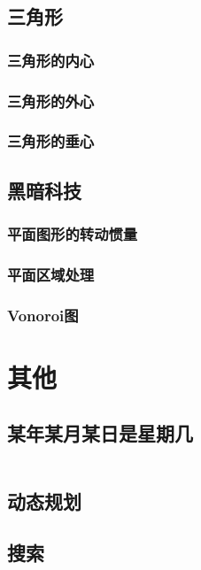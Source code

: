 \documentclass[a4paper]{article}
\newcommand{\cppcode}[1]{
    \inputminted[mathescape]{cpp}{source/#1}
}
\begin{document}
\subsection{三角形}

\subsubsection{三角形的内心}

\subsubsection{三角形的外心}

\subsubsection{三角形的垂心}

\subsection{黑暗科技}

\subsubsection{平面图形的转动惯量}

\subsubsection{平面区域处理}

\subsubsection{Vonoroi图}

\section{其他}

\subsection{某年某月某日是星期几}

\cppcode{miscellany/what-day-is-today.cpp}

\subsection{动态规划}

\subsection{搜索}
\end{document}
